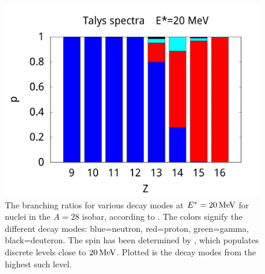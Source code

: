 \begin{figure}
\begin{center}
\includegraphics[width=\bredd\textwidth]{figures/bars/20-t-spectra.pdf}
\caption{\label{fig:barst} The branching ratios for various decay modes at $E^*=\unit[20]{MeV}$ for nuclei in the $A=28$ isobar, according to . The colors signify the different decay modes: blue=neutron, red=proton, green=gamma, black=deuteron. The spin has been determined by , which populates discrete levels close to $\unit[20]{MeV}$. Plotted is the decay modes from the highest such level.}
\end{center}
\end{figure}

